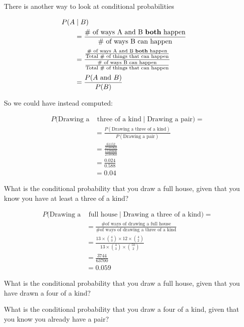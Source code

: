 %
\begin{frame}

There is another way to look at conditional probabilities

\begin{align*}
P(A & \mid B) & \\
%
&= \frac{\text{\# of ways A and B \textbf{both} happen}}{\text{\#
of ways B can happen}} \\[0.5ex]
%
&= \frac{\frac{\text{\# of ways A and B \textbf{both} happen}}{\text{Total \# of
things that can happen}}}{\frac{\text{\# of ways B can happen}}{\text{Total \# of
things that can happen}}} \\[0.5ex]
%
&= \frac{P(A \text{ and } B)}{P(B)}
\end{align*}

\end{frame}
%

%
\begin{frame}

So we could have instead computed:

\begin{align*}
P(\text{Drawing a} & \text{ three of a kind} \mid \text{Drawing a pair}) = \\
%
&= \frac{P(\text{Drawing a three of a kind})}{P(\text{Drawing a pair})} \\
%
&= \frac{\frac{61152}{2598960}}{\frac{1528800}{2598960}} \\
%
&= \frac{0.024}{0.588} \\
%
&= 0.04
\end{align*}

\end{frame}
%

%
\begin{frame}

What is the conditional probability that you draw a full house, given that you know you
have at least a three of a kind?

\begin{align*}
P(\text{Drawing a} & \text{ full house} \mid \text{Drawing a three of a kind}) = \\
%
&= \frac{\text{\# of ways of drawing a full house}}{\text{\# of ways of drawing
a three of a kind}} \\
%
&= \frac{ 13 \times {{4}\choose{3}} \times 12 \times {{4}\choose{2}} } {13
\times {{4}\choose{3}} \times {{50}\choose{2}}} \\
%
&= \frac{3744}{63700} \\
%
&= 0.059
\end{align*}

\end{frame}
%

%
\begin{frame}
What is the conditional probability that you draw a full house, given that you
have drawn a four of a kind?

What is the conditional probability that you draw a four of a kind, given that
you know you already have a pair?
\end{frame}
